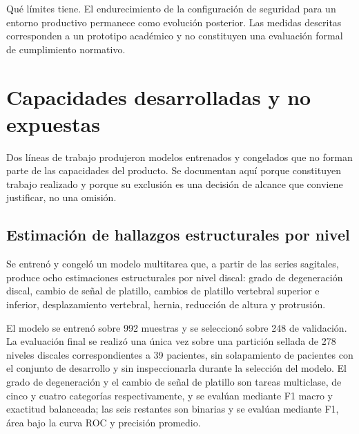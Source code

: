 Qué límites tiene. El endurecimiento de la configuración de seguridad para un entorno productivo permanece como evolución posterior. Las medidas descritas corresponden a un prototipo académico y no constituyen una evaluación formal de cumplimiento normativo.

\section{Capacidades desarrolladas y no expuestas}

Dos líneas de trabajo produjeron modelos entrenados y congelados que no forman parte de las capacidades del producto. Se documentan aquí porque constituyen trabajo realizado y porque su exclusión es una decisión de alcance que conviene justificar, no una omisión.

\subsection{Estimación de hallazgos estructurales por nivel}

Se entrenó y congeló un modelo multitarea que, a partir de las series sagitales, produce ocho estimaciones estructurales por nivel discal: grado de degeneración discal, cambio de señal de platillo, cambios de platillo vertebral superior e inferior, desplazamiento vertebral, hernia, reducción de altura y protrusión.

El modelo se entrenó sobre 992 muestras y se seleccionó sobre 248 de validación. La evaluación final se realizó una única vez sobre una partición sellada de 278 niveles discales correspondientes a 39 pacientes, sin solapamiento de pacientes con el conjunto de desarrollo y sin inspeccionarla durante la selección del modelo. El grado de degeneración y el cambio de señal de platillo son tareas multiclase, de cinco y cuatro categorías respectivamente, y se evalúan mediante F1 macro y exactitud balanceada; las seis restantes son binarias y se evalúan mediante F1, área bajo la curva ROC y precisión promedio.

